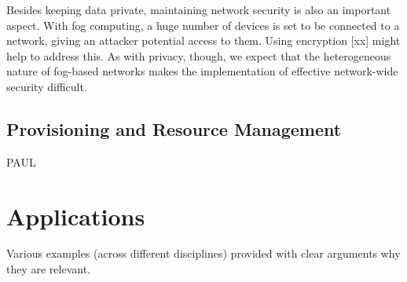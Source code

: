 \documentclass{article}
\begin{document}
Besides keeping data private, maintaining network security is also an important aspect. With fog computing, a huge number of devices is set to be connected to a network, giving an attacker potential access to them. Using encryption [xx] might help to address this. As with privacy, though, we expect that the heterogeneous nature of fog-based networks makes the implementation of effective network-wide security difficult. 


\subsection{Provisioning and Resource Management}


PAUL

\section{Applications}
Various examples (across different disciplines) provided with clear arguments why they are relevant.

\renewcommand{\refname}{\section{References}}


\end{document}
